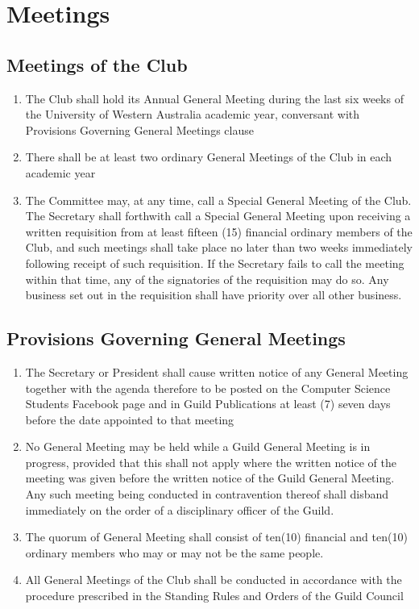\documentclass[10pt,a4paper]{report}
\begin{document}
	\chapter{Meetings}

	\section{Meetings of the Club}
	\begin{enumerate}[label=\alph*]
		\item The Club shall hold its Annual General Meeting during the last six weeks of the University of Western Australia academic year, conversant with Provisions Governing General Meetings clause
		\item There shall be at least two ordinary General Meetings of the Club in each academic year
		\item The Committee may, at any time, call a Special General Meeting of the Club. The Secretary shall forthwith call a Special General Meeting upon receiving a written requisition from at least fifteen (15) financial ordinary members of the Club, and such meetings shall take place no later than two weeks immediately following receipt of such requisition. If the Secretary fails to call the meeting within that time, any of the signatories of the requisition may do so. Any business set out in the requisition shall have priority over all other business.
	\end{enumerate}

	\section{Provisions Governing General Meetings}
	\begin{enumerate}[label=\alph*]
		\item The Secretary or President shall cause written notice of any General Meeting together with the agenda therefore to be posted on the Computer Science Students Facebook page and in Guild Publications at least (7) seven days before the date appointed to that meeting

		\item No General Meeting may be held while a Guild General Meeting is in progress, provided that this shall not apply where the written notice of the meeting was given before the written notice of the Guild General Meeting. Any such meeting being conducted in contravention thereof shall disband immediately on the order of a disciplinary officer of the Guild.

		\item The quorum of General Meeting shall consist of ten(10) financial and ten(10) ordinary members who may or may not be the same people.

		\item All General Meetings of the Club shall be conducted in accordance with the procedure prescribed in the Standing Rules and Orders of the Guild Council
	\end{enumerate}
\end{document}
